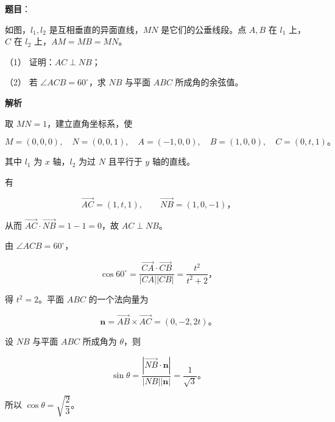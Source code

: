 \begin{answer}

\textbf{题目}：

如图，$l_1,l_2$ 是互相垂直的异面直线，$MN$ 是它们的公垂线段。点 $A,B$ 在 $l_1$ 上，$C$ 在 $l_2$ 上，$AM=MB=MN$。
\nopagebreak[4]
\begin{center}\end{center}
\nopagebreak[4]
（1） 证明：$AC\perp NB$；

（2） 若 $\angle ACB=60^\circ$，求 $NB$ 与平面 $ABC$ 所成角的余弦值。

\textbf{解析}

取 $MN=1$，建立直角坐标系，使

\nopagebreak[4]
\[
M=(0,0,0),\quad N=(0,0,1),\quad
A=(-1,0,0),\quad B=(1,0,0),\quad C=(0,t,1)\text{。}
\]

其中 $l_1$ 为 $x$ 轴，$l_2$ 为过 $N$ 且平行于 $y$ 轴的直线。


有

\nopagebreak[4]
\[
\overrightarrow{AC}=(1,t,1),\qquad \overrightarrow{NB}=(1,0,-1)\text{，}
\]

从而 $\overrightarrow{AC}\cdot\overrightarrow{NB}=1-1=0$，故 $AC\perp NB$。


由 $\angle ACB=60^\circ$，

\nopagebreak[4]
\[
\cos60^\circ
=\frac{\overrightarrow{CA}\cdot\overrightarrow{CB}}{|CA||CB|}
=\frac{t^2}{t^2+2}\text{，}
\]

得 $t^2=2$。平面 $ABC$ 的一个法向量为

\nopagebreak[4]
\[
\boldsymbol n=\overrightarrow{AB}\times\overrightarrow{AC}=(0,-2,2t)\text{。}
\]

设 $NB$ 与平面 $ABC$ 所成角为 $\theta$，则

\nopagebreak[4]
\[
\sin\theta=\frac{|\overrightarrow{NB}\cdot\boldsymbol n|}{|NB||\boldsymbol n|}
=\frac1{\sqrt3}\text{。}
\]

所以 $\cos\theta=\sqrt{\dfrac23}$。



\end{answer}
